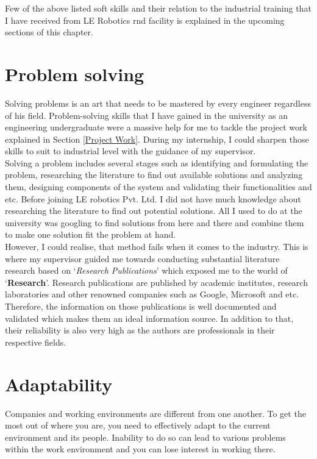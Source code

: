 \documentclass[a4paper,12pt]{report}%
\begin{document}
Few of the above listed soft skills and their relation to the industrial training that I have received from  LE Robotics \ac{rnd} facility is explained in the upcoming sections of this chapter.

\section{Problem solving} 

Solving problems is an art that needs to be mastered by every engineer regardless of his field. Problem-solving skills that I have gained in the university as an engineering undergraduate were a massive help for me to tackle the project work explained in Section \ref{Project Work}. During my internship, I could sharpen those skills to suit to industrial level with the guidance of my supervisor.\\

Solving a problem includes several stages such as identifying and formulating the problem, researching the literature to find out available solutions and analyzing them, designing components of the system and validating their functionalities and etc. Before joining LE robotics Pvt. Ltd. I did not have much knowledge about researching the literature to find out potential solutions. All I used to do at the university was googling to find solutions from here and there and combine them to make one solution fit the problem at hand.\\

However, I could realise, that method fails when it comes to the industry. This is where my supervisor guided me towards conducting substantial literature research based on `\textit{Research Publications}' which exposed me to the world of `\textbf{Research}'. Research publications are published by academic institutes, research laboratories and other renowned companies such as Google, Microsoft and etc. Therefore, the information on those publications is well documented and validated which makes them an ideal information source. In addition to that, their reliability is also very high as the authors are professionals in their respective fields.



\section{Adaptability} 

Companies and working environments are different from one another. To get the most out of where you are, you need to effectively adapt to the current environment and its people. Inability to do so can lead to various problems within the work environment and you can lose interest in working there.\\
\end{document}
